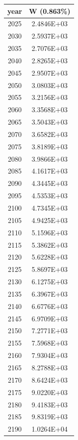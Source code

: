 \documentclass[a4paper]{article}
\begin{document}
	\noindent
	\begin{tabular}{|c|c|}
		\hline
		year & W (0.863\%) \\
		\hline
		2025 & 2.4846E+03 \\
		\hline
		2030 & 2.5937E+03 \\
		\hline
		2035 & 2.7076E+03 \\
		\hline
		2040 & 2.8265E+03 \\
		\hline
		2045 & 2.9507E+03 \\
		\hline
		2050 & 3.0803E+03 \\
		\hline
		2055 & 3.2156E+03 \\
		\hline
		2060 & 3.3568E+03 \\
		\hline
		2065 & 3.5043E+03 \\
		\hline
		2070 & 3.6582E+03 \\
		\hline
		2075 & 3.8189E+03 \\
		\hline
		2080 & 3.9866E+03 \\
		\hline
		2085 & 4.1617E+03 \\
		\hline
		2090 & 4.3445E+03 \\
		\hline
		2095 & 4.5353E+03 \\
		\hline
		2100 & 4.7345E+03 \\
		\hline
		2105 & 4.9425E+03 \\
		\hline
		2110 & 5.1596E+03 \\
		\hline
		2115 & 5.3862E+03 \\
		\hline
		2120 & 5.6228E+03 \\
		\hline
		2125 & 5.8697E+03 \\
		\hline
		2130 & 6.1275E+03 \\
		\hline
		2135 & 6.3967E+03 \\
		\hline
		2140 & 6.6776E+03 \\
		\hline
		2145 & 6.9709E+03 \\
		\hline
		2150 & 7.2771E+03 \\
		\hline
		2155 & 7.5968E+03 \\
		\hline
		2160 & 7.9304E+03 \\
		\hline
		2165 & 8.2788E+03 \\
		\hline
		2170 & 8.6424E+03 \\
		\hline
		2175 & 9.0220E+03 \\
		\hline
		2180 & 9.4183E+03 \\
		\hline
		2185 & 9.8319E+03 \\
		\hline
		2190 & 1.0264E+04 \\
		\hline

\end{tabular}
\end{document}
